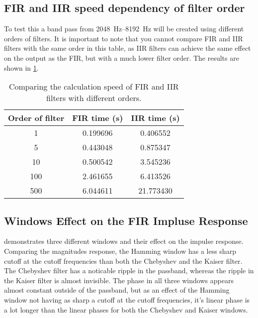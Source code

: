 \subsection{FIR and IIR speed dependency of filter order}
To test this a band pass from \SIrange{2048}{8192}{\hertz} will be created using different orders of filters. It is important to note that you cannot compare FIR and IIR filters with the same order in this table, as IIR filters can achieve the same effect on the output as the FIR, but with a much lower filter order. The results are shown in \cref{tab:order_speed}.
\begin{table}[!htb]
	\centering
	\caption{Comparing the calculation speed of FIR and IIR filters with different orders.}
	\label{tab:order_speed}
	\begin{tabular}{ccc}
		Order of filter & FIR time (\si{\second}) & IIR time (\si{\second}) \\
		\midrule
		1		&	\num{0.199696} & \num{0.406552}\\
		5		& \num{0.443048} & \num{0.875347} \\
		10		& \num{0.500542}	 & \num{3.545236}\\
		100		& \num{2.461655}	 & \num{6.413526} \\
		500		& \num{6.044611}	 & \num{21.773430} \\
	\end{tabular}
\end{table}

\subsection{Windows Effect on the FIR Impluse Response}
 demonstrates three different windows and their effect on the impulse response. Comparing the magnitudes response, the Hamming window has a less sharp cutoff at the cutoff frequencies than both the Chebyshev and the Kaiser filter. The Chebyshev filter has a noticable ripple in the passband, whereas the ripple in the Kaiser filter is almost invisible. The phase in all three windows appears almost constant outside of the passband, but as an effect of the Hamming window not having as sharp a cutoff at the cutoff frequencies, it's linear phase is a lot longer than the linear phases for both the Chebyshev and Kaiser windows.
	
